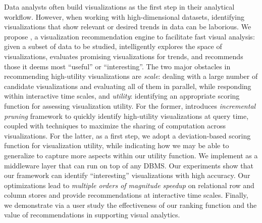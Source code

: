 Data analysts often build visualizations
as the first step in their analytical workflow.
However, when working with high-dimensional datasets, identifying visualizations
that show relevant or desired trends in data can be laborious.
We propose \SeeDB, a visualization recommendation engine to facilitate fast 
visual analysis: 
given a subset of data to be studied, \SeeDB intelligently explores the 
space of visualizations, evaluates promising visualizations for trends, and 
recommends those it 
deems most ``useful'' or ``interesting''.%
The two major obstacles in recommending high-utility visualizations are {\em scale}:
dealing with a large number of candidate visualizations and evaluating all of them in parallel, while
responding within interactive time scales, and {\em utility}: identifying 
an appropriate scoring function for assessing visualization utility.
For the former, \SeeDB introduces {\em incremental 
pruning} framework to quickly identify high-utility visualizations at query time,
coupled with techniques to maximize 
the sharing of computation across visualizations.
For the latter, as a first step,%
we adopt a 
deviation-based scoring function for visualization 
utility, while indicating how we may be able to generalize to capture more aspects
within our utility function.
We implement \SeeDB as a middleware layer that can run on top of any DBMS. 
Our experiments show that our framework can identify ``interesting'' visualizations with high accuracy. 
Our optimizations lead to 
{\em multiple orders of magnitude speedup} on relational row and column stores and provide
recommendations at interactive time scales.
Finally, we demonstrate via a user study the effectiveness of our ranking function
and the value of recommendations in supporting visual analytics. 
